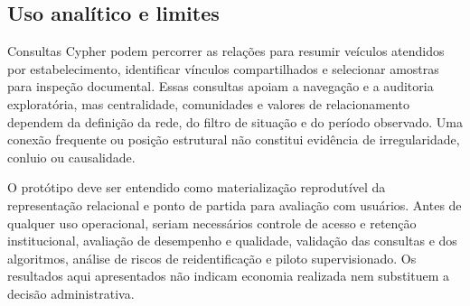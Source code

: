 \subsection{Uso analítico e limites}

Consultas Cypher podem percorrer as relações para resumir veículos atendidos por estabelecimento, identificar vínculos compartilhados e selecionar amostras para inspeção documental. Essas consultas apoiam a navegação e a auditoria exploratória, mas centralidade, comunidades e valores de relacionamento dependem da definição da rede, do filtro de situação e do período observado. Uma conexão frequente ou posição estrutural não constitui evidência de irregularidade, conluio ou causalidade.

O protótipo deve ser entendido como materialização reprodutível da representação relacional e ponto de partida para avaliação com usuários. Antes de qualquer uso operacional, seriam necessários controle de acesso e retenção institucional, avaliação de desempenho e qualidade, validação das consultas e dos algoritmos, análise de riscos de reidentificação e piloto supervisionado. Os resultados aqui apresentados não indicam economia realizada nem substituem a decisão administrativa.


